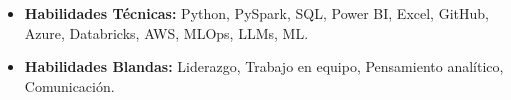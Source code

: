 \begin{itemize}[leftmargin=*]
  \item \textbf{Habilidades Técnicas:} Python, PySpark, SQL, Power BI, Excel, GitHub, Azure, Databricks, AWS, MLOps, LLMs, ML.
  \item \textbf{Habilidades Blandas:} Liderazgo, Trabajo en equipo, Pensamiento analítico, Comunicación.
\end{itemize}
